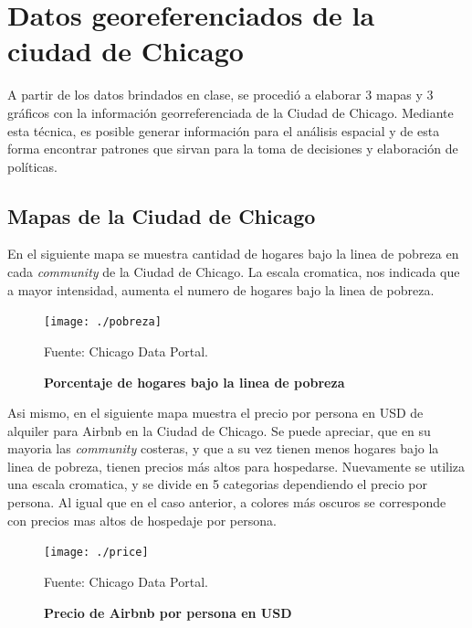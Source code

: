 \documentclass[12pt]{article} %
\begin{document}
\section {Datos georeferenciados de la ciudad de Chicago}

A partir de los datos brindados en clase, se procedió a elaborar 3 mapas y 3 gráficos con la información georreferenciada de la Ciudad de Chicago. Mediante esta técnica, es posible generar información para el análisis espacial y de esta forma encontrar patrones que sirvan para la toma de decisiones y elaboración de políticas.

\subsection{Mapas de la Ciudad de Chicago}

En el siguiente mapa se muestra cantidad de hogares bajo la linea de pobreza en cada \textit{community} de la Ciudad de Chicago. La escala cromatica, nos indicada que a mayor intensidad, aumenta el numero de hogares bajo la linea de pobreza.
     

\begin{figure}[H]
	\centering
	\begin{minipage}{0.64\textwidth}
		\centering
		\caption{\textbf{Porcentaje de hogares bajo la linea de pobreza}}
		\texttt{[image: ./pobreza]} %
		\begin{flushleft}
			{\footnotesize Fuente: Chicago Data Portal.}
		\end{flushleft}
\end{minipage} \end{figure} 
    
Asi mismo, en el siguiente mapa muestra el precio por persona en USD de alquiler para Airbnb en la Ciudad de Chicago. Se puede apreciar, que en su mayoria las \textit{community} costeras, y que a su vez tienen menos hogares bajo la linea de pobreza, tienen precios más altos para hospedarse. Nuevamente se utiliza una escala cromatica, y se divide en 5 categorias dependiendo el precio por persona. Al igual que en el caso anterior, a colores más oscuros se corresponde con precios mas altos de hospedaje por persona.

\begin{figure}[H]
	\centering
	\begin{minipage}{0.65\textwidth}
		\centering
		\caption{\textbf{Precio de Airbnb por persona en USD}}
		\texttt{[image: ./price]} %
		\begin{flushleft}
			{\footnotesize Fuente: Chicago Data Portal.}
		\end{flushleft}
\end{minipage} \end{figure} 
\end{document}
